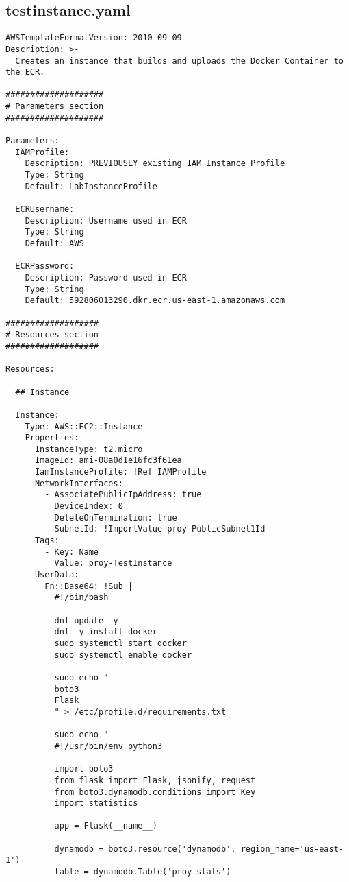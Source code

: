 \subsection{testinstance.yaml}

\begin{verbatim}
AWSTemplateFormatVersion: 2010-09-09
Description: >-
  Creates an instance that builds and uploads the Docker Container to the ECR.

####################
# Parameters section
####################

Parameters:
  IAMProfile:
    Description: PREVIOUSLY existing IAM Instance Profile
    Type: String
    Default: LabInstanceProfile

  ECRUsername:
    Description: Username used in ECR
    Type: String
    Default: AWS

  ECRPassword:
    Description: Password used in ECR
    Type: String
    Default: 592806013290.dkr.ecr.us-east-1.amazonaws.com

###################
# Resources section
###################

Resources:

  ## Instance

  Instance:
    Type: AWS::EC2::Instance
    Properties:
      InstanceType: t2.micro
      ImageId: ami-08a0d1e16fc3f61ea
      IamInstanceProfile: !Ref IAMProfile
      NetworkInterfaces:
        - AssociatePublicIpAddress: true
          DeviceIndex: 0
          DeleteOnTermination: true
          SubnetId: !ImportValue proy-PublicSubnet1Id
      Tags:
        - Key: Name
          Value: proy-TestInstance
      UserData:
        Fn::Base64: !Sub |
          #!/bin/bash

          dnf update -y
          dnf -y install docker
          sudo systemctl start docker
          sudo systemctl enable docker

          sudo echo "
          boto3
          Flask
          " > /etc/profile.d/requirements.txt

          sudo echo "
          #!/usr/bin/env python3

          import boto3
          from flask import Flask, jsonify, request
          from boto3.dynamodb.conditions import Key
          import statistics

          app = Flask(__name__)

          dynamodb = boto3.resource('dynamodb', region_name='us-east-1')
          table = dynamodb.Table('proy-stats')


\end{verbatim}

